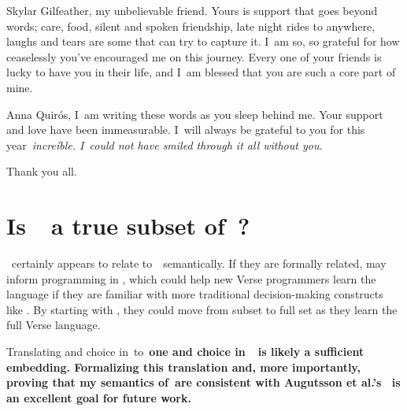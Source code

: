 \documentclass[manuscript,screen, 12pt, nonacm]{acmart}
\begin{document}
Skylar Gilfeather, my unbelievable friend. Yours is support that goes
beyond words; care, food, silent and spoken friendship, late night rides to
anywhere, laughs and tears are some that can try to capture it. I~am so, so
grateful for how ceaselessly you've encouraged me on this journey. Every one
of your friends is lucky to have you in their life, and I~am blessed that 
you are such a core part of mine. 

Anna Quirós, I~am writing these words as you sleep behind me. Your support
and love have been immeasurable. I~will always be grateful to you for this
year~\it{increíble}. I~could not have smiled through it all without you. 

Thank you all. 



\renewcommand\thesection{\Alph{section}}
\setcounter{section}{0}


\section{Is~\VMinus\ a true subset of~\VC?}
\VMinus\ certainly appears to relate to~\VC\ semantically. If they are formally
related, \VMinus may inform programming in \VC, which could help new Verse
programmers learn the language if they are familiar with more traditional
decision-making constructs like \iffibf. By starting with \VMinus, they could
move from subset to full set as they learn the full Verse language. 

Translating \iffibf and choice in~\VMinus to~\bf{one} and choice in~\VC\ is
likely a sufficient embedding. Formalizing this translation and, more
importantly, proving that my semantics of~\VMinus are consistent with Augutsson
et al.'s \VC\ is an excellent goal for future work. 
\end{document}
